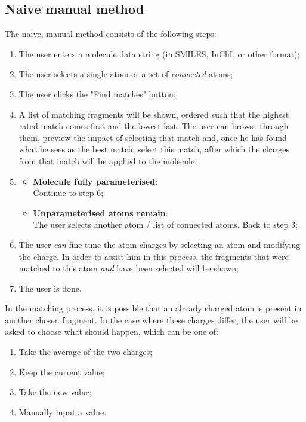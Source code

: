 \subsection{Naive manual method}
The naive, manual method consists of the following steps:
\begin{enumerate}[itemsep=.1em, parsep=.2em, topsep=0em]
\item The user enters a molecule data string (in SMILES, InChI, or other format);
\item The user selects a single atom or a set of \emph{connected} atoms;
\item The user clicks the "Find matches" button;
\item A list of matching fragments will be shown, ordered such that the highest rated match comes first and the lowest last. The user can browse through them, preview the impact of selecting that match and, once he has found what he sees as the best match, select this match, after which the charges from that match will be applied to the molecule;
\item
\begin{itemize}[leftmargin=0cm, itemsep=.1em, parsep=.1em]
\item[] {\bf Molecule fully parameterised}:\\Continue to step 6;
\item[]{\bf Unparameterised atoms remain}:\\The user selects another atom / list of connected atoms. Back to step 3;
\end{itemize}
\item The user \emph{can} fine-tune the atom charges by selecting an atom and modifying the charge. In order to assist him in this process, the fragments that were matched to this atom \emph{and} have been selected will be shown;
\item The user is done.
\end{enumerate}

\noindent
In the matching process, it is possible that an already charged atom is present in another chosen fragment. In the case where these charges differ, the user will be asked to choose what should happen, which can be one of:
\begin{enumerate}[itemsep=.1em, parsep=.2em, topsep=0em]
\item Take the average of the two charges;
\item Keep the current value;
\item Take the new value;
\item Manually input a value.
\end{enumerate}

